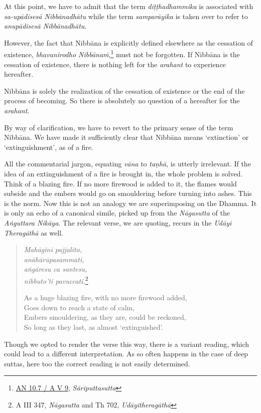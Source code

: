 At this point, we have to admit that the term \emph{diṭṭhadhammika} is associated with \emph{sa-upādisesā Nibbānadhātu} while the term \emph{samparāyika} is taken over to refer to \emph{anupādisesā Nibbānadhātu}.

However, the fact that Nibbāna is explicitly defined elsewhere as the cessation of existence, \emph{bhavanirodho Nibbānaṁ},\footnote{\href{https://suttacentral.net/an10.7/pli/ms}{AN 10.7 / A V 9}, \emph{Sāriputtasutta}} must not be forgotten. If Nibbāna is the cessation of existence, there is nothing left for the \emph{arahant} to experience hereafter.

Nibbāna is solely the realization of the cessation of existence or the end of the process of becoming. So there is absolutely no question of a hereafter for the \emph{arahant}.

By way of clarification, we have to revert to the primary sense of the term Nibbāna. We have made it sufficiently clear that Nibbāna means `extinction' or `extinguishment', as of a fire.

All the commentarial jargon, equating \emph{vāna} to \emph{taṇhā}, is utterly irrelevant. If the idea of an extinguishment of a fire is brought in, the whole problem is solved. Think of a blazing fire. If no more firewood is added to it, the flames would subside and the embers would go on smouldering before turning into ashes. This is the norm. Now this is not an analogy we are superimposing on the Dhamma. It is only an echo of a canonical simile, picked up from the \emph{Nāgasutta} of the \emph{Aṅguttara Nikāya}. The relevant verse, we are quoting, recurs in the \emph{Udāyi Theragāthā} as well.

\begin{quote}
\emph{Mahāgini pajjalito,}\\
\emph{anāhārūpasammati,}\\
\emph{aṅgāresu ca santesu,}\\
\emph{nibbuto'ti pavuccati.}\footnote{A III 347, \emph{Nāgasutta} and Th 702, \emph{Udāyitheragāthā}}

As a huge blazing fire, with no more firewood added,\\
Goes down to reach a state of calm,\\
Embers smouldering, as they are, could be reckoned,\\
So long as they last, as almost `extinguished'.
\end{quote}

Though we opted to render the verse this way, there is a variant reading, which could lead to a different interpretation. As so often happens in the case of deep suttas, here too the correct reading is not easily determined.


